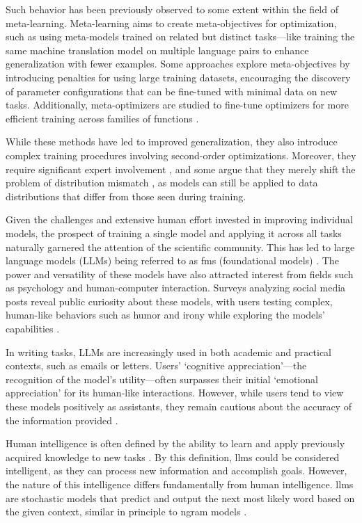 Such behavior has been previously observed to some extent within the field of meta-learning. Meta-learning aims to create meta-objectives for optimization, such as using meta-models trained on related but distinct tasks—like training the same machine translation model on multiple language pairs to enhance generalization with fewer examples. Some approaches explore meta-objectives by introducing penalties for using large training datasets, encouraging the discovery of parameter configurations that can be fine-tuned with minimal data on new tasks. Additionally, meta-optimizers are studied to fine-tune optimizers for more efficient training across families of functions \cite{metalearning}.

\pskip

While these methods have led to improved generalization, they also introduce complex training procedures involving second-order optimizations. Moreover, they require significant expert involvement \cite{Yao2018TakingHO}, and some argue that they merely shift the problem of distribution mismatch \cite{wiles2021finegrainedanalysisdistributionshift}, as models can still be applied to data distributions that differ from those seen during training.

\pskip

Given the challenges and extensive human effort invested in improving individual models, the prospect of training a single model and applying it across all tasks naturally garnered the attention of the scientific community. This has led to large language models (LLMs) being referred to as \glspl{fm} (foundational models) \cite{foundationalmodels}. The power and versatility of these models have also attracted interest from fields such as psychology and human-computer interaction. Surveys analyzing social media posts reveal public curiosity about these models, with users testing complex, human-like behaviors such as humor and irony while exploring the models’ capabilities \cite{Dynel2023}.

\pskip

In writing tasks, LLMs are increasingly used in both academic and practical contexts, such as emails or letters. Users’ ‘cognitive appreciation’—the recognition of the model’s utility—often surpasses their initial ‘emotional appreciation’ for its human-like interactions. However, while users tend to view these models positively as assistants, they remain cautious about the accuracy of the information provided \cite{Luther2024} \cite{XinXiaCao2023} \cite{Herbold2023}.

\pskip

Human intelligence is often defined by the ability to learn and apply previously acquired knowledge to new tasks \cite{Sternberg2012}. By this definition, \glspl{llm} could be considered intelligent, as they can process new information and accomplish goals. However, the nature of this intelligence differs fundamentally from human intelligence. \glspl{llm} are stochastic models that predict and output the next most likely word based on the given context, similar in principle to \gls{ngram} models \cite{brown1992class}.
